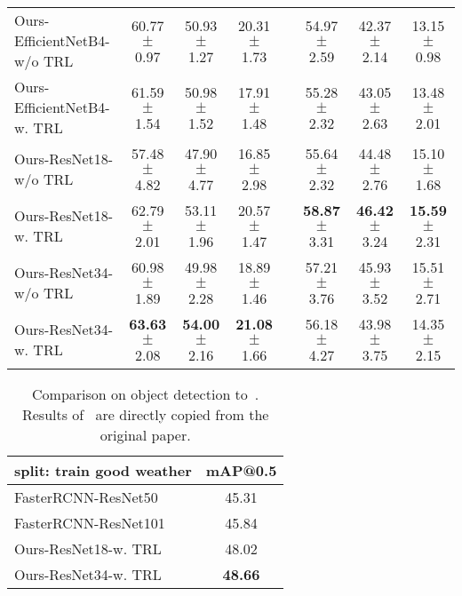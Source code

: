 \documentclass[10pt,twocolumn,letterpaper]{article}
\begin{document}
\begin{table*}
{\begin{tabular}{lccccccc}
    \midrule
    
    Ours-EfficientNetB4-w/o TRL & 60.77\scriptsize{$\pm$ 0.97} & 50.93\scriptsize{$\pm$ 1.27} & 20.31\scriptsize{$\pm$ 1.73} & & 54.97\scriptsize{$\pm$ 2.59} & 42.37\scriptsize{$\pm$ 2.14} & 13.15\scriptsize{$\pm$ 0.98} \\
    Ours-EfficientNetB4-w. TRL & 61.59\scriptsize{$\pm$ 1.54} & 50.98\scriptsize{$\pm$ 1.52} & 17.91\scriptsize{$\pm$ 1.48} & & 55.28\scriptsize{$\pm$ 2.32} & 43.05\scriptsize{$\pm$ 2.63} & 13.48\scriptsize{$\pm$ 2.01} \\
    Ours-ResNet18-w/o TRL & 57.48\scriptsize{$\pm$ 4.82} & 47.90\scriptsize{$\pm$ 4.77} & 16.85\scriptsize{$\pm$ 2.98} & & 55.64\scriptsize{$\pm$ 2.32} & 44.48\scriptsize{$\pm$ 2.76} & 15.10\scriptsize{$\pm$ 1.68} \\
    Ours-ResNet18-w. TRL & 62.79\scriptsize{$\pm$ 2.01} & 53.11\scriptsize{$\pm$ 1.96} & 20.57\scriptsize{$\pm$ 1.47} & & \textbf{58.87}\scriptsize{$\pm$ 3.31} & \textbf{46.42}\scriptsize{$\pm$ 3.24} & \textbf{15.59}\scriptsize{$\pm$ 2.31} \\
    Ours-ResNet34-w/o TRL & 60.98\scriptsize{$\pm$ 1.89} & 49.98\scriptsize{$\pm$ 2.28} & 18.89\scriptsize{$\pm$ 1.46} & & 57.21\scriptsize{$\pm$ 3.76} & 45.93\scriptsize{$\pm$ 3.52} & 15.51\scriptsize{$\pm$ 2.71} \\
    Ours-ResNet34-w. TRL & \textbf{63.63}\scriptsize{$\pm$ 2.08} & \textbf{54.00}\scriptsize{$\pm$ 2.16} & \textbf{21.08}\scriptsize{$\pm$ 1.66} & & 56.18\scriptsize{$\pm$ 4.27} & 43.98\scriptsize{$\pm$ 3.75} & 14.35\scriptsize{$\pm$ 2.15} \\
    
    \bottomrule
  \end{tabular}\vspace{-4mm}
  }
\end{table*}

\begin{table}
  \caption{Comparison on object detection to~\cite{sheeny2020radiate}. Results of~\cite{sheeny2020radiate} are directly copied from the original paper.}\vspace{-3mm}
  \label{tab:det_full}
  \centering
  \setlength\tabcolsep{2pt}
  {
  \begin{tabular}{lc}
    \toprule
    split: train good weather & mAP@0.5  \\
    \midrule
    FasterRCNN-ResNet50~\cite{sheeny2020radiate} & 45.31 \\
    FasterRCNN-ResNet101~\cite{sheeny2020radiate} & 45.84 \\
    Ours-ResNet18-w. TRL & 48.02 \\
    Ours-ResNet34-w. TRL & \textbf{48.66} \\
    \bottomrule
  \end{tabular}\vspace{-6mm}
  }
\end{table}
\end{document}
